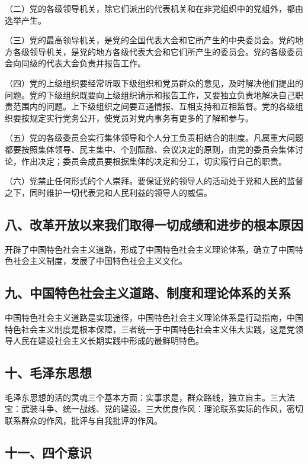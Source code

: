 \documentclass[UTF8,11pt,a4paper]{ctexart}
\begin{document}
\noindent （二）党的各级领导机关，除它们派出的代表机关和在非党组织中的党组外，都由选举产生。

\noindent （三）党的最高领导机关，是党的全国代表大会和它所产生的中央委员会。党的地方各级领导机关，是党的地方各级代表大会和它们所产生的委员会。党的各级委员会向同级的代表大会负责并报告工作。

\noindent （四）党的上级组织要经常听取下级组织和党员群众的意见，及时解决他们提出的问题。党的下级组织既要向上级组织请示和报告工作，又要独立负责地解决自己职责范围内的问题。上下级组织之间要互通情报、互相支持和互相监督。党的各级组织要按规定实行党务公开，使党员对党内事务有更多的了解和参与。

\noindent （五）党的各级委员会实行集体领导和个人分工负责相结合的制度。凡属重大问题都要按照集体领导、民主集中、个别酝酿、会议决定的原则，由党的委员会集体讨论，作出决定；委员会成员要根据集体的决定和分工，切实履行自己的职责。

\noindent （六）党禁止任何形式的个人崇拜。要保证党的领导人的活动处于党和人民的监督之下，同时维护一切代表党和人民利益的领导人的威信。

\subsection*{八、改革开放以来我们取得一切成绩和进步的根本原因}

开辟了中国特色社会主义道路，形成了中国特色社会主义理论体系，确立了中国特色社会主义制度，发展了中国特色社会主义文化。

\subsection*{九、中国特色社会主义道路、制度和理论体系的关系}

中国特色社会主义道路是实现途径，中国特色社会主义理论体系是行动指南，中国特色社会主义制度是根本保障，三者统一于中国特色社会主义伟大实践，这是党领导人民在建设社会主义长期实践中形成的最鲜明特色。

\subsection*{十、毛泽东思想}

毛泽东思想的活的灵魂三个基本方面：实事求是，群众路线，独立自主。三大法宝：武装斗争、统一战线、党的建设。三大优良作风：理论联系实际的作风，密切联系群众的作风，批评与自我批评的作风。

\subsection*{十一、四个意识}
\end{document}
